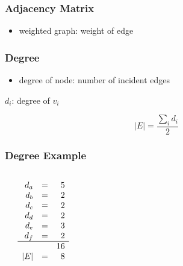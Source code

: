 \documentclass[dvipsnames]{beamer}
\begin{document}
\begin{frame}
  \frametitle{Adjacency Matrix}

  \begin{itemize}
    \item weighted graph: weight of edge
  \end{itemize}

\end{frame}

\begin{frame}
  \frametitle{Degree}

  \begin{itemize}
    \item \alert{degree} of node: number of incident edges
  \end{itemize}

  \pause
  \begin{theorem}
    $d_i$: degree of $v_i$

    \[ |E| = \frac{\sum_i d_i}{2} \]
  \end{theorem}
\end{frame}

\begin{frame}
  \frametitle{Degree Example}

  \begin{columns}
    \begin{center}
    \end{center}

    $\begin{array}{rcr}
    d_a & = & 5\\
    d_b & = & 2\\
    d_c & = & 2\\
    d_d & = & 2\\
    d_e & = & 3\\
    d_f & = & 2\\\hline
        &   & 16\\
    \medskip
    |E| & = & 8
    \end{array}$
  \end{columns}
\end{frame}
\end{document}
